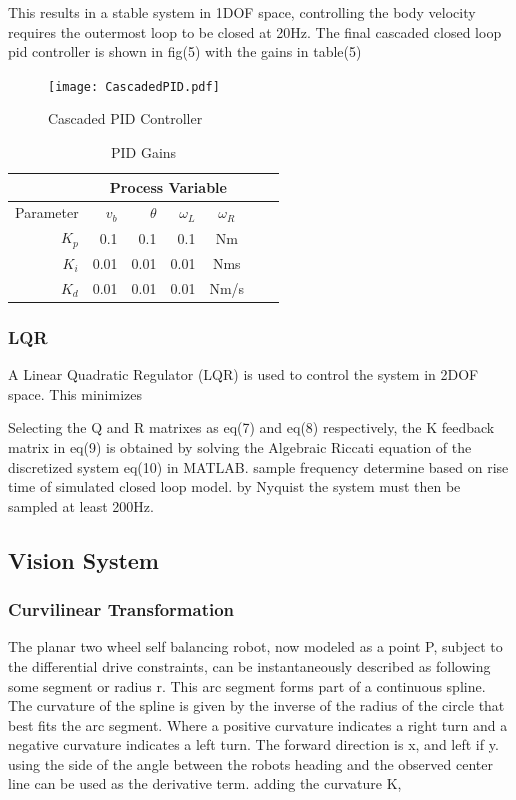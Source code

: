         This results in a stable system in 1DOF space, controlling the body velocity requires the outermost loop to be closed at 20Hz.
        The final cascaded closed loop pid controller is shown in fig(5) with the gains in table(5)

        \begin{figure}[H]
            \texttt{[image: CascadedPID.pdf]}
            \caption{Cascaded PID Controller}
        \end{figure}

        \begin{table}[H]
            \centering
            \begin{tabular}{|r|r|r|r|c|c|c}
                \hline
                & \multicolumn{4}{c|}{Process Variable}  \\
                \hline
                Parameter & $v_b$ & $\theta$  & $\omega_L$ & $\omega_R$ \\
                \hline      
                $K_p$ & 0.1 & 0.1 & 0.1 & Nm \\
                $K_i$ & 0.01 & 0.01 & 0.01 & Nms \\
                $K_d$ & 0.01 & 0.01 & 0.01 & Nm/s \\
                \hline
            \end{tabular}
            \caption{PID Gains}
        \end{table}
        \pagebreak{}
        \subsubsection{LQR}
        A Linear Quadratic Regulator (LQR) is used to control the system in 2DOF space.
        This minimizes 
        
       
        Selecting the Q and R matrixes as eq(7) and eq(8) respectively, 
        the K feedback matrix in eq(9) is obtained by solving the Algebraic Riccati
        equation of the discretized system eq(10) in MATLAB.
        sample frequency determine based on rise time of simulated closed loop model. 
        by Nyquist the system must then be sampled at least 200Hz. 
         

    \subsection{Vision System}
        \subsubsection{Curvilinear Transformation}
        The planar two wheel self balancing robot, now modeled as a point P, subject to the differential drive constraints, 
        can be instantaneously described as following some segment or radius r. This arc segment forms part of a continuous spline. 
        The curvature of the spline is given by the inverse of the radius of the circle that best fits the arc segment.
        Where a positive curvature indicates a right turn and a negative curvature indicates a left turn.
        The forward direction is x, and left if y. using the side of the angle between the robots heading and the observed center line can be used as the derivative term.
        adding the curvature K, 
